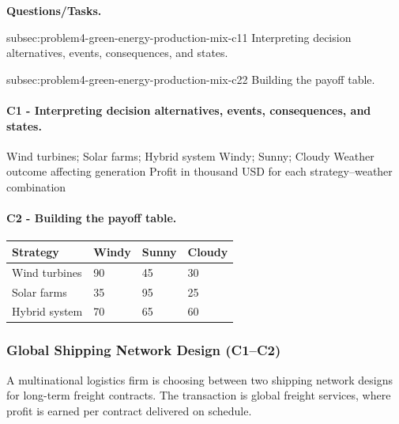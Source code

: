 	\textbf{Questions/Tasks.}
	\begin{enumerate}
		\CriterionTask
		{subsec:problem4-green-energy-production-mix-c1}{1}
		{Interpreting decision alternatives, events, consequences, and states.}

		\CriterionTask
		{subsec:problem4-green-energy-production-mix-c2}{2}
		{Building the payoff table.}
	\end{enumerate}

	\paragraph*{C1 - Interpreting decision alternatives, events, consequences, and states.}
	\label{subsec:problem4-green-energy-production-mix-c1}
	\DecisionElementsTable
	{Wind turbines; Solar farms; Hybrid system}
	{Windy; Sunny; Cloudy}
	{Weather outcome affecting generation}
	{Profit in thousand USD for each strategy--weather combination}


	\paragraph*{C2 - Building the payoff table.}
	\label{subsec:problem4-green-energy-production-mix-c2}
	\begin{center}
		\begin{tabular}{llll}
			\toprule
			Strategy & Windy & Sunny & Cloudy \\
			\midrule
			Wind turbines & 90 & 45 & 30 \\
			Solar farms & 35 & 95 & 25 \\
			Hybrid system & 70 & 65 & 60 \\
			\bottomrule
		\end{tabular}
	\end{center}


	\subsubsection{Global Shipping Network Design (C1--C2)}
	\label{sec:problem5-global-shipping-network-design-c1-c2}
	A multinational logistics firm is choosing between two shipping network designs for long-term freight contracts. The transaction is global freight services, where profit is earned per contract delivered on schedule.

